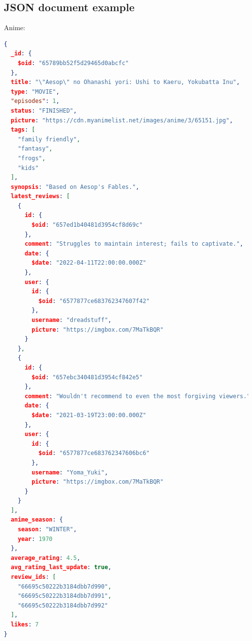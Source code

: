 \subsection*{JSON document example}
Anime:
\begin{lstlisting}[language=json]
{
  _id: {
    $oid: "65789bb52f5d29465d0abcfc"
  },
  title: "\"Aesop\" no Ohanashi yori: Ushi to Kaeru, Yokubatta Inu",
  type: "MOVIE",
  "episodes": 1,
  status: "FINISHED",
  picture: "https://cdn.myanimelist.net/images/anime/3/65151.jpg",
  tags: [
    "family friendly",
    "fantasy",
    "frogs",
    "kids"
  ],
  synopsis: "Based on Aesop's Fables.",
  latest_reviews: [
    {
      id: {
        $oid: "657ed1b40481d3954cf8d69c"
      },
      comment: "Struggles to maintain interest; fails to captivate.",
      date: {
        $date: "2022-04-11T22:00:00.000Z"
      },
      user: {
        id: {
          $oid: "6577877ce683762347607f42"
        },
        username: "dreadstuff",
        picture: "https://imgbox.com/7MaTkBQR"
      }
    },
    {
      id: {
        $oid: "657ebc340481d3954cf842e5"
      },
      comment: "Wouldn't recommend to even the most forgiving viewers.",
      date: {
        $date: "2021-03-19T23:00:00.000Z"
      },
      user: {
        id: {
          $oid: "6577877ce683762347606bc6"
        },
        username: "Yoma_Yuki",
        picture: "https://imgbox.com/7MaTkBQR"
      }
    }
  ],
  anime_season: {
    season: "WINTER",
    year: 1970
  },
  average_rating: 4.5,
  avg_rating_last_update: true,
  review_ids: [
    "66695c50222b3184dbb7d990",
    "66695c50222b3184dbb7d991",
    "66695c50222b3184dbb7d992"
  ],
  likes: 7
}\end{lstlisting}

